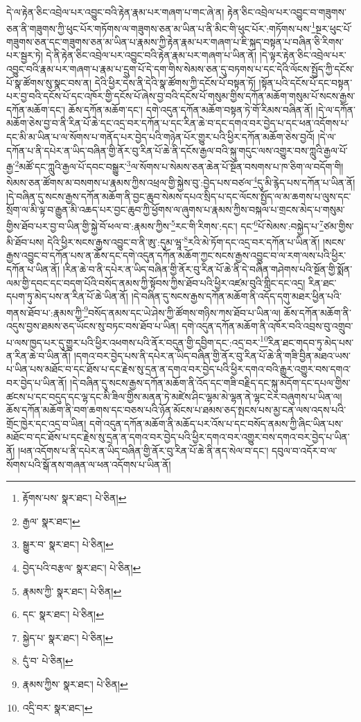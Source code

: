 དེ་ལ་རྟེན་ཅིང་འབྲེལ་པར་འབྱུང་བའི་རྟེན་རྣམ་པར་གཞག་པ་གང་ཞེ་ན། རྟེན་ཅིང་འབྲེལ་པར་འབྱུང་བ་གཟུགས་ཅན་ནི་གཟུགས་ཀྱི་ཕུང་པོར་གཏོགས་ལ་གཟུགས་ཅན་མ་ཡིན་པ་ནི་མིང་གི་ཕུང་པོར་:གཏོགས་པས་\footnote{རྟོགས་པས་  སྣར་ཐང་།  པེ་ཅིན། }སྔར་ཕུང་པོ་གཟུགས་ཅན་དང་གཟུགས་ཅན་མ་ཡིན་པ་རྣམས་ཀྱི་རྟེན་རྣམ་པར་གཞག་པ་ཇི་སྐད་བསྟན་པ་བཞིན་ཅི་རིགས་པར་སྦྱར་ཏེ། དེ་ནི་རྟེན་ཅིང་འབྲེལ་པར་འབྱུང་བའི་རྟེན་རྣམ་པར་གཞག་པ་ཡིན་ནོ། །དེ་ལྟར་རྟེན་ཅིང་འབྲེལ་པར་འབྱུང་བའི་རྣམ་པར་གཞག་པ་རྣམ་པ་དྲུག་པོ་དེ་དག་གིས་སེམས་ཅན་དུ་བཏགས་པ་དང་དེའི་ལོངས་སྤྱོད་ཀྱི་དངོས་པོ་སྣ་ཚོགས་སུ་སྣང་བས་ན། དེའི་ཕྱིར་དེས་ནི་དེའི་སྣ་ཚོགས་ཀྱི་དངོས་པོ་བསྟན་ཏོ། །སྟོན་པའི་དངོས་པོ་དང་བསྟན་པར་བྱ་བའི་དངོས་པོ་དང་འཁོར་གྱི་དངོས་པོ་ཞེས་བྱ་བའི་དངོས་པོ་གསུམ་གྱིས་དཀོན་མཆོག་གསུམ་པོ་སངས་རྒྱས་དཀོན་མཆོག་དང་། ཆོས་དཀོན་མཆོག་དང་། དགེ་འདུན་དཀོན་མཆོག་བསྟན་ཏེ་གོ་རིམས་བཞིན་ནོ། །དེ་ལ་དཀོན་མཆོག་ཅེས་བྱ་བ་ནི་རིན་པོ་ཆེ་དང་འདྲ་བར་དཀོན་པ་དང་རིན་ཆེ་བ་དང་དགའ་བར་བྱེད་པ་དང་ཕན་འདོགས་པ་དང་མི་མ་ཡིན་པ་ལ་སོགས་པ་གནོད་པར་བྱེད་པའི་གཉེན་པོར་གྱུར་པའི་ཕྱིར་དཀོན་མཆོག་ཅེས་བྱའོ། །དེ་ལ་དཀོན་པ་ནི་དཔེར་ན་ཡིད་བཞིན་གྱི་ནོར་བུ་རིན་པོ་ཆེ་ནི་དངོས་རྒྱལ་བའི་སྐུ་གདུང་ལས་འགྱུར་བས་ཀླུའི་རྒྱལ་པོ་རྒྱ་\footnote{རྒྱལ་  སྣར་ཐང་། }མཚོ་དང་ཀླུའི་རྒྱལ་པོ་དབང་བསྒྱུར་\footnote{སྒྱུར་བ་  སྣར་ཐང་།  པེ་ཅིན། }ལ་སོགས་པ་སེམས་ཅན་ཆེན་པོ་སྔོན་བསགས་པ་ཁ་ཅིག་ལ་བདོག་གི། སེམས་ཅན་ཚོགས་མ་བསགས་པ་རྣམས་ཀྱིས་འཕྲལ་གྱི་སྐྱེས་བུ་:བྱེད་པས་བཙལ་\footnote{བྱེད་པའི་བརྩལ་  སྣར་ཐང་།  པེ་ཅིན། }དུ་མི་རྙེད་པས་དཀོན་པ་ཡིན་ནོ། །དེ་བཞིན་དུ་སངས་རྒྱས་དཀོན་མཆོག་ནི་བྱང་ཆུབ་སེམས་དཔའ་སྲིད་པ་དང་ལོངས་སྤྱོད་ལ་མ་ཆགས་པ་ལུས་དང་སྲོག་ལ་མི་ལྟ་བ་རྒྱུན་མི་འཆད་པར་བྱང་ཆུབ་ཀྱི་ཕྱོགས་ལ་ཞུགས་པ་རྣམས་ཀྱིས་བསྐལ་པ་གྲངས་མེད་པ་གསུམ་གྱིས་ཐོབ་པར་བྱ་བ་ཡིན་གྱི་སྐྱེ་བོ་ཕལ་བ་:རྣམས་ཀྱིས་\footnote{རྣམས་ཀྱི་  སྣར་ཐང་།  པེ་ཅིན། }རང་གི་རིགས་:དང་། དང་\footnote{དང་  སྣར་ཐང་།  པེ་ཅིན། }པོ་སེམས་:བསྐྱེད་པ་\footnote{སྐྱེད་པ་  སྣར་ཐང་།  པེ་ཅིན། }ཙམ་གྱིས་མི་ཐོབ་པས། དེའི་ཕྱིར་སངས་རྒྱས་འབྱུང་བ་ནི་ཨུ་:དུམ་ཝཱ་\footnote{དུཾ་བ་  པེ་ཅིན། }རའི་མེ་ཏོག་དང་འདྲ་བར་དཀོན་པ་ཡིན་ནོ། །སངས་རྒྱས་འབྱུང་བ་དཀོན་པས་ན་ཆོས་དང་དགེ་འདུན་དཀོན་མཆོག་ཀྱང་སངས་རྒྱས་འབྱུང་བ་ལ་རག་ལས་པའི་ཕྱིར་དཀོན་པ་ཡིན་ནོ། །རིན་ཆེ་བ་ནི་དཔེར་ན་ཡིད་བཞིན་གྱི་ནོར་བུ་རིན་པོ་ཆེ་ནི་དེ་བཞིན་གཤེགས་པའི་སྔོན་གྱི་སྨོན་ལམ་གྱི་དབང་དང་བདག་པོའི་བསོད་ནམས་ཀྱི་སྟོབས་ཀྱིས་ཐོབ་པའི་ཕྱིར་འཛམ་བུའི་གླིང་དང་འདྲ། རིན་ཐང་དཔག་ཏུ་མེད་པས་ན་རིན་པོ་ཆེ་ཡིན་ནོ། །དེ་བཞིན་དུ་སངས་རྒྱས་དཀོན་མཆོག་ནི་འདོད་དགུ་མཐར་ཕྱིན་པའི་གནས་ཐོབ་པ་:རྣམས་ཀྱི་\footnote{རྣམས་ཀྱིས་  སྣར་ཐང་།  པེ་ཅིན། }བསོད་ནམས་དང་ཡེ་ཤེས་ཀྱི་ཚོགས་གཉིས་ཀས་ཐོབ་པ་ཡིན་ལ། ཆོས་དཀོན་མཆོག་ནི་འདུས་བྱས་ཐམས་ཅད་ཡོངས་སུ་བཏང་བས་ཐོབ་པ་ཡིན། དགེ་འདུན་དཀོན་མཆོག་ནི་འཁོར་བའི་འབྲས་བུ་འགྲུབ་པ་ལས་ཁྱད་པར་དུ་གྱུར་པའི་ཕྱིར་འཕགས་པའི་ནོར་བདུན་གྱི་དབྱིག་དང་:འདྲ་བར་\footnote{འདྲི་བར་  སྣར་ཐང་། }རིན་ཐང་གདབ་ཏུ་མེད་པས་ན་རིན་ཆེ་བ་ཡིན་ནོ། །དགའ་བར་བྱེད་པས་ནི་དཔེར་ན་ཡིད་བཞིན་གྱི་ནོར་བུ་རིན་པོ་ཆེ་ནི་གཟི་བྱིན་མཐའ་ཡས་པ་ཡིན་པས་མཐོང་བ་དང་ཐོས་པ་དང་རྗེས་སུ་དྲན་ན་དགའ་བར་བྱེད་པའི་ཕྱིར་དགའ་བའི་རྒྱུར་འགྱུར་བས་དགའ་བར་བྱེད་པ་ཡིན་ནོ། །དེ་བཞིན་དུ་སངས་རྒྱས་དཀོན་མཆོག་ནི་འོད་དང་གཟི་བརྗིད་དང་སྐུ་མདོག་དང་དཔལ་གྱིས་ཚངས་པ་དང་བདུད་དང་ལྷ་དང་མི་ཟིལ་གྱིས་མནན་ཏེ་མཛེས་ཤིང་ལྷམ་མེ་ལྷན་ནེ་ལྷང་ངེར་བཞུགས་པ་ཡིན་ལ། ཆོས་དཀོན་མཆོག་ནི་བག་ཆགས་དང་བཅས་པའི་ཉོན་མོངས་པ་ཐམས་ཅད་སྤངས་པས་མྱ་ངན་ལས་འདས་པའི་གྲོང་ཁྱེར་དང་འདྲ་བ་ཡིན། དགེ་འདུན་དཀོན་མཆོག་ནི་མཆོད་པར་འོས་པ་དང་བསོད་ནམས་ཀྱི་ཞིང་ཡིན་པས་མཐོང་བ་དང་ཐོས་པ་དང་རྗེས་སུ་དྲན་ན་དགའ་བར་བྱེད་པའི་ཕྱིར་དགའ་བར་འགྱུར་བས་དགའ་བར་བྱེད་པ་ཡིན་ནོ། །ཕན་འདོགས་པ་ནི་དཔེར་ན་ཡིད་བཞིན་གྱི་ནོར་བུ་རིན་པོ་ཆེ་ནི་ནད་སེལ་བ་དང་། དབུལ་བ་འདོར་བ་ལ་སོགས་པའི་སྒོ་ནས་གཞན་ལ་ཕན་འདོགས་པ་ཡིན་ནོ། 